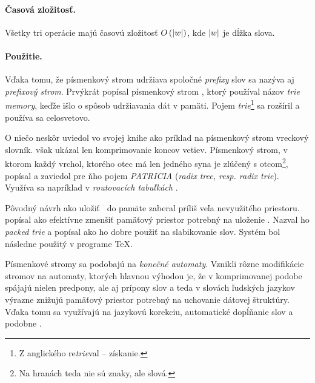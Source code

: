 \paragraph{Časová zložitosť.}
Všetky tri operácie majú časovú zložitosť $O\left( |w|\right)$, kde $|w|$ 
je dĺžka slova.

\paragraph{Použitie.}
Vďaka tomu, že písmenkový strom udržiava spoločné \emph{prefixy} slov sa 
nazýva aj \emph{prefixový strom}.
Prvýkrát popísal písmenkový strom \citet{fredkin}, ktorý používal názov 
\emph{trie memory}, keďže išlo o spôsob udržiavania dát v pamäti. Pojem 
\emph{trie}\footnote{Z anglického re\emph{trie}val -- získanie.} 
sa rozšíril a používa sa celosvetovo.

O niečo neskôr \citet{knuth} uviedol vo svojej knihe ako príklad na 
písmenkový strom vreckový slovník. 
\citet{knuth} však ukázal len komprimovanie koncov vetiev. Písmenkový 
strom, v ktorom každý vrchol, ktorého otec má len jedného syna 
je zlúčený s otcom\footnote{Na hranách teda nie sú znaky, ale slová.}, 
popísal \citet{patricia} a zaviedol pre ňho pojem \emph{PATRICIA} 
(\emph{radix tree, resp. radix trie}). Využíva sa napríklad v 
\emph{routovacích tabuľkách} \citep{radix}.

Pôvodný návrh \citep{fredkin} ako uložiť \trie\ do pamäte zaberal príliš 
veľa nevyužitého priestoru. \citet{liang} popísal ako efektívne zmenšiť 
pamäťový priestor potrebný na uloženie \trie. Nazval ho \emph{packed trie} 
a popísal ako ho dobre použiť na slabikovanie slov. Systém bol následne 
použitý v programe \TeX. 

Písmenkové stromy sa podobajú na \emph{konečné automaty}. 
Vznikli rôzne modifikácie stromov na automaty, ktorých hlavnou výhodou je, 
že v komprimovanej podobe spájajú nielen predpony, ale aj prípony slov 
a teda v slovách ľudských jazykov výrazne znižujú pamäťový priestor potrebný 
na uchovanie dátovej štruktúry. Vďaka tomu sa využívajú na jazykovú korekciu, 
automatické dopĺňanie slov a podobne \citep{scrabble,ca}. 

